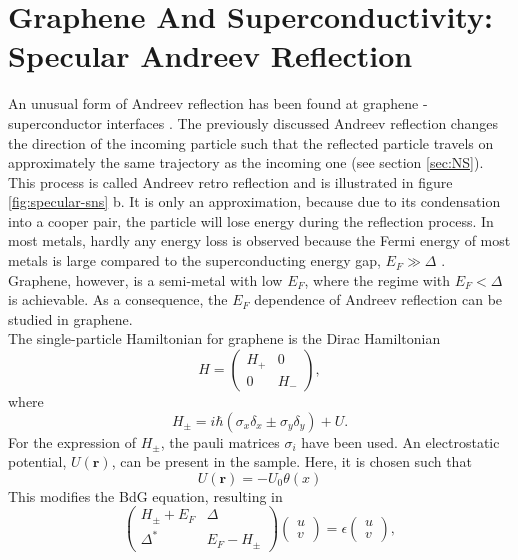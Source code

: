 \section{Graphene And Superconductivity: Specular Andreev Reflection}
An unusual form of Andreev reflection has been found at graphene - superconductor interfaces \cite{Beenakker2006}. The previously discussed Andreev reflection changes the direction of the incoming particle such that the reflected particle travels on approximately the same trajectory as the incoming one (see section \ref{sec:NS}). This process is called Andreev retro reflection and is illustrated in figure \ref{fig:specular-sns} b. It is only an approximation, because due to its condensation into a cooper pair, the particle will lose energy during the reflection process. In most metals, hardly any energy loss is observed because the Fermi energy of most metals is large compared to the superconducting energy gap, $E_F \gg \Delta$ \cite{Efetov2016}. Graphene, however, is a semi-metal with low $E_F$, where the regime with $E_F < \Delta$ is achievable. As a consequence, the $E_F$ dependence of Andreev reflection can be studied in graphene. \\
The single-particle Hamiltonian for graphene is the Dirac Hamiltonian
\begin{equation}
H = \begin{pmatrix}
H_+ & 0 \\
0 & H_- 
\end{pmatrix},
\end{equation}
where
\begin{equation}
H_\pm = i \hbar \left( \sigma_x \delta_x \pm \sigma_y \delta_y \right) + U.
\end{equation}
For the expression of $H_\pm$, the pauli matrices $\sigma_i$ have been used. An electrostatic potential, $U(\mathbf{r})$, can be present in the sample. Here, it is chosen such that
\begin{equation}
U(\mathbf{r}) = -U_0 \theta (x)
\end{equation} 
This modifies the BdG equation, resulting in 
\begin{equation}
\begin{pmatrix}
H_\pm + E_F & \Delta \\
\Delta^* & E_F - H_\pm 
\end{pmatrix} \begin{pmatrix}
u \\ v \end{pmatrix} = \epsilon \begin{pmatrix} u \\v \end{pmatrix}, \label{eq:dirac-hamiltonian}
\end{equation}
